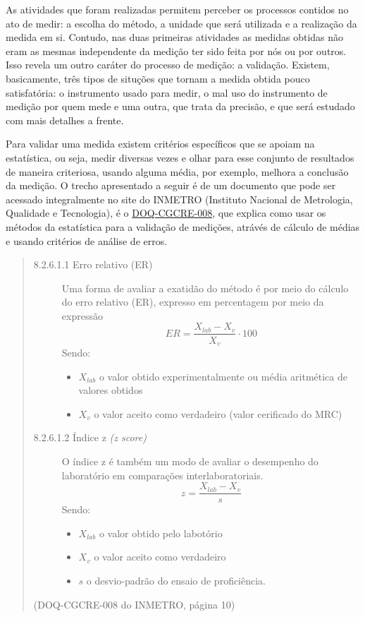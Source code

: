 As atividades que foram realizadas permitem perceber os processos contidos no ato de medir: a escolha do método, a unidade que será utilizada e a realização da medida em si. Contudo, nas duas primeiras atividades as medidas obtidas não eram as mesmas independente da medição ter sido feita por nós ou por outros. Isso revela um outro caráter do processo de medição: a validação. Existem, basicamente, três tipos de situções que tornam a medida obtida pouco satisfatória: o instrumento usado para medir, o mal uso do instrumento de medição por quem mede e uma outra, que trata da precisão, e que será estudado com mais detalhes a frente.

Para validar uma medida existem critérios específicos que se apoiam na estatística, ou seja, medir diversas vezes e olhar para esse conjunto de resultados de maneira criteriosa, usando alguma média, por exemplo, melhora a conclusão da medição. O trecho apresentado a seguir é de um documento que pode ser acessado integralmente no site do INMETRO (Instituto Nacional de Metrologia, Qualidade e Tecnologia), é o \href{http://www.inmetro.gov.br/Sidoq/Arquivos/Cgcre/DOQ/DOQ-Cgcre-8\_04.pdf}{DOQ-CGCRE-008}, que explica como usar os métodos da estatística  para a validação de medições, atrávés de cálculo de médias e usando critérios de análise de erros.
\begin{quote}
\begin{description}
	\item[8.2.6.1.1 Erro relativo (ER)] Uma forma de avaliar a exatidão do método é por meio do cálculo do erro relativo (ER), expresso em percentagem por meio da expressão
	\begin{equation*}
		ER=\frac{X_{lab}-X_v}{X_v}\cdot100
	\end{equation*}
	Sendo:
	\begin{itemize}
		\item $X_{lab}$ o valor obtido experimentalmente ou média aritmética de valores obtidos
		\item $X_v$ o valor aceito como verdadeiro (valor cerificado do MRC)
	\end{itemize}
	\item[8.2.6.1.2 Índice z \textit{(z score)}] O índice z é também um modo de avaliar o desempenho do laboratório em comparações interlaboratoriais.
	\begin{equation*}
		z=\frac{X_{lab}-X_v}{s}
	\end{equation*}
	Sendo:
	\begin{itemize}
		\item $X_{lab}$ o valor obtido pelo labotório
		\item $X_v$ o valor aceito como verdadeiro
		\item $s$ o desvio-padrão do ensaio de proficiência.
	\end{itemize}
\end{description}
\flushright (DOQ-CGCRE-008 do INMETRO, página 10)
\end{quote}

